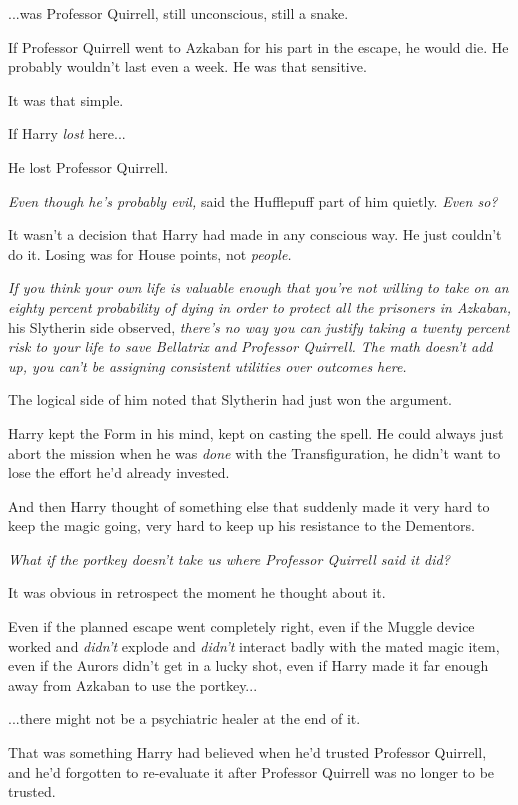 ...was Professor Quirrell, still unconscious, still a snake.

If Professor Quirrell went to Azkaban for his part in the escape, he
would die. He probably wouldn't last even a week. He was that sensitive.

It was that simple.

If Harry \emph{lost} here...

He lost Professor Quirrell.

\emph{Even though he's probably evil,} said the Hufflepuff part of him
quietly. \emph{Even so?}

It wasn't a decision that Harry had made in any conscious way. He just
couldn't do it. Losing was for House points, not \emph{people.}

\emph{If you think your own life is valuable enough that you're not
willing to take on an eighty percent probability of dying in order to
protect all the prisoners in Azkaban,} his Slytherin side observed,
\emph{there's no way you can justify taking a twenty percent risk to
your life to save Bellatrix and Professor Quirrell. The math doesn't add
up, you can't be assigning consistent utilities over outcomes here.}

The logical side of him noted that Slytherin had just won the argument.

Harry kept the Form in his mind, kept on casting the spell. He could
always just abort the mission when he was \emph{done} with the
Transfiguration, he didn't want to lose the effort he'd already
invested.

And then Harry thought of something else that suddenly made it very hard
to keep the magic going, very hard to keep up his resistance to the
Dementors.

\emph{What if the portkey doesn't take us where Professor Quirrell said
it did?}

It was obvious in retrospect the moment he thought about it.

Even if the planned escape went completely right, even if the Muggle
device worked and \emph{didn't} explode and \emph{didn't} interact badly
with the mated magic item, even if the Aurors didn't get in a lucky
shot, even if Harry made it far enough away from Azkaban to use the
portkey...

...there might not be a psychiatric healer at the end of it.

That was something Harry had believed when he'd trusted Professor
Quirrell, and he'd forgotten to re-evaluate it after Professor Quirrell
was no longer to be trusted.

